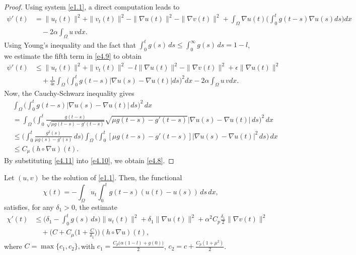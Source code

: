 \documentclass[reqno]{amsart}
\begin{document}
\begin{proof}
Using system \eqref{e1.1}, a direct computation leads to
\begin{equation}
\begin{aligned}
 \psi'(t) &= \| u_t(t) \|^2 + \| v_t(t) \|^2 -\| \nabla u(t) \|^2
  -\| \nabla v(t) \|^2 + \int_{\Omega} \nabla u(t)
  \Big( \int_0^t g(t - s) \nabla u(s) ds \Big) dx \\
&\quad - 2 \alpha\int_{\Omega} u \, v dx.
\end{aligned} \label{e4.9}
\end{equation}
Using Young's inequality and the fact that
$\int_0^t g(s) \, ds \leq \int_0^{\infty} g(s) \, ds = 1 - l$, we
estimate the fifth term in \eqref{e4.9} to  obtain
\begin{equation}
\begin{aligned}
 \psi'(t) &\leq \| u_t(t) \|^2 + \| v_t(t) \|^2 - l \| \nabla u(t)\|^2
 -\| \nabla v(t) \|^2 + \epsilon \| \nabla u(t) \|^2\\
&\quad +\frac{1}{4\epsilon} \int_{\Omega}
 \Big( \int_0^t g(t - s) |\nabla u(s) - \nabla u(t)| ds \Big)^2 dx
 - 2 \alpha\int_{\Omega} u \, v dx.
\end{aligned}\label{e4.10}
\end{equation}
 Now, the  Cauchy-Schwarz inequality gives
\begin{equation}
\begin{aligned}
&\int_{\Omega} \Big( \int_0^{t} g(t - s) |\nabla u(s) - \nabla u(t)| \, ds \Big)^2
 \, dx \\
&=\int_{\Omega} \Big(\int_0^{t} \frac{g(t - s)}{\sqrt{\mu g(t - s)
 - g'(t - s)}} \sqrt{\mu g(t - s) - g'(t - s)} |\nabla u(s) - \nabla u(t)| \, ds \Big)^2
   \, dx\\
&\leq \Big( \int_0^{t} \frac{g^2(s)}{\mu g(s) - g'(s)} \, ds \Big)
 \int_{\Omega} \Big( \int_0^{t} [\mu g(t - s) - g'(t - s)] |\nabla u(s)
 - \nabla u(t)|^2 \, ds \Big) \, dx \\
&\leq C_\mu (h \circ \nabla u)(t).
\end{aligned} \label{e4.11}
\end{equation}
By substituting \eqref{e4.11} into \eqref{e4.10}, we obtain \eqref{e4.8}.
\end{proof}

\begin{lemma}  \label{lem8}
Let $(u, v)$ be the solution of \eqref{e1.1}. Then, the functional
\[
 \chi(t) = -\int_{\Omega} u_t \int_0^t g(t - s)(u(t) - u(s)) \, ds \, dx,
\]
satisfies, for any $ \delta_{1} > 0$, the estimate
\begin{equation}
\begin{aligned}
 \chi'(t) &\leq  \Big(\delta_{1} - \int_0^t g(s) \, ds \Big) \| u_t (t)\|^2
  + \delta_{1} \| \nabla u (t) \|^2
  +\alpha^2 C_p \frac{\delta_{1}}{2} \| \nabla v (t)\|^2 \\
&\quad +\Big(C+ C_\mu \Big( 1+ \frac{C}{ \delta_{1}}\Big) \Big)
 (h \circ \nabla u)(t),
\end{aligned} \label{e4.12}
\end{equation}
 where $C=\max\{c_1,c_2\},$\quad with $c_1=\frac{C_{p}\big(\alpha(1-l)+g(0)\big)}{2}$,
 $c_2= c+\frac{C_{p}(1+\mu^2)}{2}$.
\end{lemma}
\end{document}
